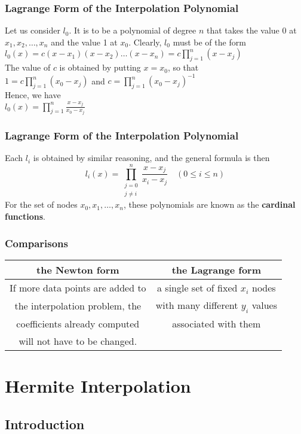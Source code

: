 \documentclass[notheorems,mathserif,table,compress]{beamer}  %
\begin{document}
\begin{frame}
  \frametitle{Lagrange Form of the Interpolation Polynomial}
  Let us consider $l_0$. It is to be a polynomial of degree $n$ that takes the value 0 at $x_1,x_2,\ldots,x_n$ and the value 1 at $x_0$. Clearly, $l_0$ must be of the form\\
  \quad \quad $l_0(x)=c(x-x_1)(x-x_2)\ldots(x-x_n)=c\prod_{j=1}^n (x-x_j)$\\
  The value of $c$ is obtained by putting $x=x_0$, so that\\
  \quad \quad $1=c\prod_{j=1}^n (x_0-x_j)$ \quad and $c=\prod_{j=1}^n(x_0-x_j)^{-1}$\\
  Hence, we have \\
  \quad \quad $l_0(x)=\prod_{j=1}^n \frac{x-x_j}{x_0-x_j}$
  
\end{frame}


\begin{frame}
  \frametitle{Lagrange Form of the Interpolation Polynomial}
  Each $l_i$ is obtained by similar reasoning, and the general formula is then 
  \[ l_i(x)=\prod_{\substack{j=0 \\ j \ne i}}^n \frac{x-x_j}{x_i-x_j} \quad (0 \le i \le n) \]
  For the set of nodes $x_0,x_1,\ldots,x_n$, these polynomials are known as the \textbf{cardinal functions}.
\end{frame}


\begin{frame}
  \frametitle{Comparisons}
  \begin{tabular}{|c| c|}
  \hline
  the Newton form & the Lagrange form\\
  \hline
  If more data points are added to  & a single set of fixed $x_i$ nodes \\
  the interpolation problem, the  & with many different $y_i$ values\\
  coefficients already computed  & associated with them\\
  will not have to be changed. &  \\
  \hline
  \end{tabular}
\end{frame}





\section{Hermite Interpolation}


\subsection{Introduction}
\end{document}
